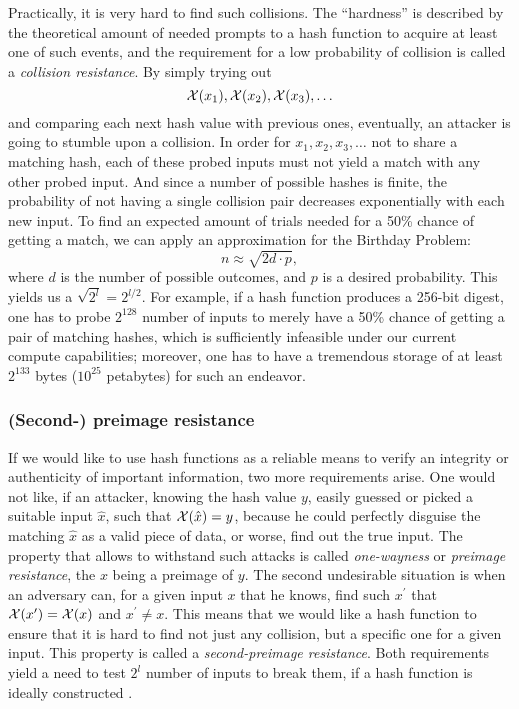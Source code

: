Practically, it is very hard to find such collisions. The ``hardness'' is described by the theoretical amount of needed prompts to a hash function to acquire at least one of such events, and the requirement for a low probability of collision is called a \textit{collision resistance}. By simply trying out 
\[
\mathcal{X}(x_1), \mathcal{X}(x_2), \mathcal{X}(x_3), \ldots
\]
and comparing each next hash value with previous ones, eventually, an attacker is going to stumble upon a collision. In order for $x_1, x_2, x_3, \ldots$ not to share a matching hash, each of these probed inputs must not yield a match with any other probed input. And since a number of possible hashes is finite, the probability of not having a single collision pair decreases exponentially with each new input. To find an expected amount of trials needed for a 50\% chance of getting a match, we can apply an approximation for the Birthday Problem: 
\[n\approx \sqrt{2d\cdot p}, \]
where $d$ is the number of possible outcomes, and $p$ is a desired probability. This yields us a $\sqrt{2^l} = 2^{l/2}$. For example, if a hash function produces a 256-bit digest, one has to probe $2^{128}$ number of inputs to merely have a 50\% chance of getting a pair of matching hashes, which is sufficiently infeasible under our current compute capabilities; moreover, one has to have a tremendous storage of at least $2^{133}$ bytes ($10^{25}$ petabytes) for such an endeavor.

\subsubsection{(Second-) preimage resistance}
If we would like to use hash functions as a reliable means to verify an integrity or authenticity of important information, two more requirements arise. One would not like, if an attacker, knowing the hash value $y$, easily guessed or picked a suitable input $\hat{x}$, such that $\mathcal{X}(\hat{x}) = y$, because he could perfectly disguise the matching $\hat{x}$ as a valid piece of data, or worse, find out the true input. The property that allows to withstand such attacks is called \textit{one-wayness} or \textit{preimage resistance}, the $x$ being a preimage of $y$. The second undesirable situation is when an adversary can, for a given input $x$ that he knows, find such $x^\prime$ that $\mathcal{X}(x^\prime) = \mathcal{X}(x)$ and $x^\prime \neq x$. This means that we would like a hash function to ensure that it is hard to find not just any collision, but a specific one for a given input. This property is called a \textit{second-preimage resistance}. Both requirements yield a need to test $2^{l}$ number of inputs to break them, if a hash function is ideally constructed \cite{cryptmadesimple}.

